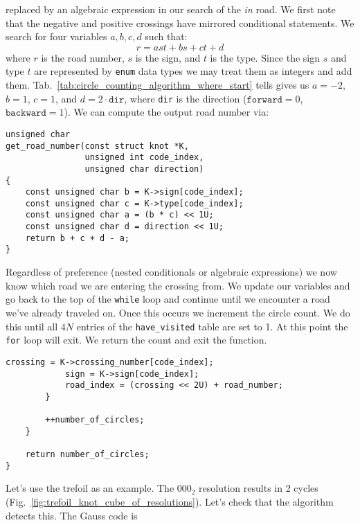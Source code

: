         replaced by an algebraic expression in our search of the
        \textit{in} road. We first note that the negative and positive crossings
        have mirrored conditional statements. We search for four variables
        $a,b,c,d$ such that:
        \begin{equation}
            r=ast+bs+ct+d
        \end{equation}
        where $r$ is the road number, $s$ is the sign, and $t$ is the type.
        Since the sign $s$ and type $t$ are represented by \texttt{enum} data
        types we may treat them as integers and add them.
        Tab.~\ref{tab:circle_counting_algorithm_where_start} tells gives us
        $a=-2$, $b=1$, $c=1$, and $d=2\cdot\texttt{dir}$, where \texttt{dir} is
        the direction ($\texttt{forward}=0$, $\texttt{backward}=1$). We can
        compute the output road number via:
\begin{lstlisting}[style=CStyle]
unsigned char
get_road_number(const struct knot *K,
                unsigned int code_index,
                unsigned char direction)
{
    const unsigned char b = K->sign[code_index];
    const unsigned char c = K->type[code_index];
    const unsigned char a = (b * c) << 1U;
    const unsigned char d = direction << 1U;
    return b + c + d - a;
}
\end{lstlisting}
        Regardless of preference (nested conditionals or algebraic expressions)
        we now know which road we are entering the crossing from.
        We update our variables and go back to the top of the
        \texttt{while} loop and continue until
        we encounter a road we've already traveled on. Once this occurs we
        increment the circle count. We do this until all $4N$ entries of the
        \texttt{have\_visited} table are set to 1. At this point the
        \texttt{for} loop will exit. We return the count and exit the function.
\begin{lstlisting}[style=CStyle, firstnumber = 157]
            crossing = K->crossing_number[code_index];
            sign = K->sign[code_index];
            road_index = (crossing << 2U) + road_number;
        }

        ++number_of_circles;
    }

    return number_of_circles;
}
\end{lstlisting}
        Let's use the trefoil as an example. The $000_{2}$ resolution results
        in 2 cycles (Fig.~\ref{fig:trefoil_knot_cube_of_resolutions}). Let's
        check that the algorithm detects this. The Gauss code is
